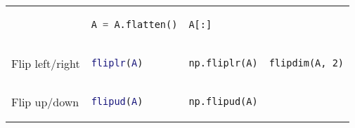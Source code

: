 \documentclass[10pt, landscape]{article}
\begin{document}
\begin{multicols}{2}
\begin{tabular}[]{@{}llll@{}}
\begin{minipage}[t]{0.23\columnwidth}
\end{minipage} & \begin{minipage}[t]{0.20\columnwidth}\raggedright
\begin{lstlisting}[language=Python]
A = A.flatten()
\end{lstlisting}

\end{minipage} & \begin{minipage}[t]{0.20\columnwidth}\raggedright
\begin{lstlisting}
A[:]
\end{lstlisting}

\end{minipage}\tabularnewline
\begin{minipage}[t]{0.24\columnwidth}\raggedright
Flip left/right
\end{minipage} & \begin{minipage}[t]{0.23\columnwidth}\raggedright
\begin{lstlisting}[language=Matlab]
fliplr(A)
\end{lstlisting}

\end{minipage} & \begin{minipage}[t]{0.20\columnwidth}\raggedright
\begin{lstlisting}[language=Python]
np.fliplr(A)
\end{lstlisting}

\end{minipage} & \begin{minipage}[t]{0.20\columnwidth}\raggedright
\begin{lstlisting}
flipdim(A, 2)
\end{lstlisting}

\end{minipage}\tabularnewline
\begin{minipage}[t]{0.24\columnwidth}\raggedright
Flip up/down
\end{minipage} & \begin{minipage}[t]{0.23\columnwidth}\raggedright
\begin{lstlisting}[language=Matlab]
flipud(A)
\end{lstlisting}

\end{minipage} & \begin{minipage}[t]{0.20\columnwidth}\raggedright
\begin{lstlisting}[language=Python]
np.flipud(A)
\end{lstlisting}


\end{minipage}
\end{tabular}
\end{multicols}
\end{document}
